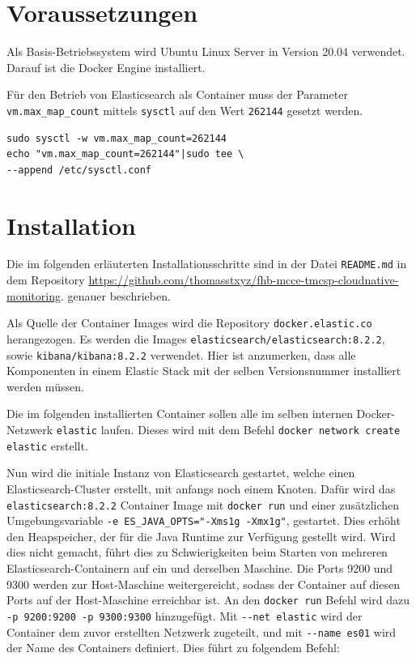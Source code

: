 \section{Voraussetzungen}
Als Basis-Betriebssystem wird Ubuntu Linux Server 
in Version 20.04 \cite{ubuntuServerWebsite} verwendet.
Darauf ist die Docker Engine \cite{dockerEngineWebsite} installiert.

Für den Betrieb von Elasticsearch als Container muss der 
Parameter \verb|vm.max_map_count| mittels \verb|sysctl| 
auf den Wert \verb|262144| gesetzt werden.

\begin{verbatim}
sudo sysctl -w vm.max_map_count=262144
echo "vm.max_map_count=262144"|sudo tee \
--append /etc/sysctl.conf
\end{verbatim}


\section{Installation}
Die im folgenden erläuterten Installationsschritte
sind in der Datei \verb|README.md| in dem Repository
\url{https://github.com/thomasstxyz/fhb-mcce-tmcsp-cloudnative-monitoring}.
genauer beschrieben.

Als Quelle der Container Images wird die Repository
\verb|docker.elastic.co| herangezogen.
Es werden die Images \verb|elasticsearch/elasticsearch:8.2.2|, sowie
\verb|kibana/kibana:8.2.2| verwendet.
Hier ist anzumerken, dass alle Komponenten in einem
Elastic Stack mit der selben Versionsnummer installiert werden
müssen.

Die im folgenden installierten Container sollen alle 
im selben internen Docker-Netzwerk \verb|elastic| laufen.
Dieses wird mit dem Befehl
\verb|docker network create elastic| erstellt.

Nun wird die initiale Instanz von Elasticsearch gestartet, 
welche einen Elasticsearch-Cluster erstellt, mit anfangs
noch einem Knoten.
Dafür wird das \verb|elasticsearch:8.2.2| Container Image
mit \verb|docker run| und einer zusätzlichen Umgebungsvariable 
\verb|-e ES_JAVA_OPTS="-Xms1g -Xmx1g"|,
gestartet. Dies erhöht den Heapspeicher, der für die 
Java Runtime zur Verfügung gestellt wird. 
Wird dies nicht gemacht, führt dies zu Schwierigkeiten
beim Starten von mehreren Elasticsearch-Containern 
auf ein und derselben Maschine.
Die Ports 9200 und 9300 werden zur Host-Maschine weitergereicht,
sodass der Container auf diesen Ports auf der Host-Maschine
erreichbar ist. An den \verb|docker run| Befehl wird 
dazu \verb|-p 9200:9200 -p 9300:9300| hinzugefügt.
Mit \verb|--net elastic| wird der Container dem zuvor erstellten
Netzwerk zugeteilt, und mit \verb|--name es01| wird der Name 
des Containers definiert. 
Dies führt zu folgendem Befehl:

